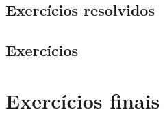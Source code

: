 \subsection*{Exercícios resolvidos}

\construirExeresol

\subsection*{Exercícios}

\construirExer

\section{Exercícios finais}

\construirExer

%
